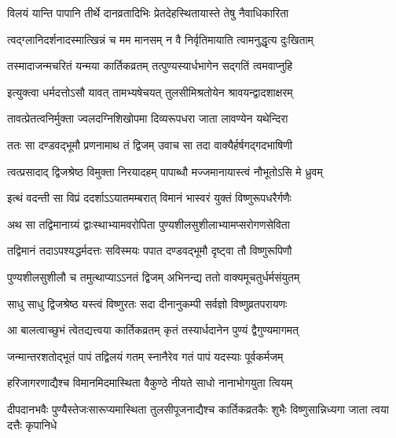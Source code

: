 


\twolineshloka
{विलयं यान्ति पापानि तीर्थे दानव्रतादिभिः}
{प्रेतदेहस्थितायास्ते तेषु नैवाधिकारिता} %

\twolineshloka
{त्वद्ग्लानिदर्शनादस्मात्खिन्नं च मम मानसम्}
{न वै निर्वृतिमायाति त्वामनुद्धृत्य दुःखिताम्} %

\twolineshloka
{तस्मादाजन्मचरितं यन्मया कार्तिकव्रतम्}
{तत्पुण्यस्यार्धभागेन सद्गतिं त्वमवाप्नुहि} %


\twolineshloka
{इत्युक्त्वा धर्मदत्तोऽसौ यावत् तामभ्यषेचयत्}
{तुलसीमिश्रतोयेन श्रावयन्द्वादशाक्षरम्} %

\twolineshloka
{तावत्प्रेतत्वनिर्मुक्ता ज्वलदग्निशिखोपमा}
{दिव्यरूपधरा जाता लावण्येन यथेन्दिरा} %

\twolineshloka
{ततः सा दण्डवद्भूमौ प्रणनामाथ तं द्विजम्}
{उवाच सा तदा वाक्यैर्हर्षगद्गदभाषिणी} %


\twolineshloka
{त्वत्प्रसादाद् द्विजश्रेष्ठ विमुक्ता निरयादहम्}
{पापाब्धौ मज्जमानायास्त्वं नौभूतोऽसि मे ध्रुवम्} %


\twolineshloka
{इत्थं वदन्ती सा विप्रं ददर्शाऽऽयातमम्बरात्}
{विमानं भास्वरं युक्तं विष्णुरूपधरैर्गणैः} %

\twolineshloka
{अथ सा तद्विमानाग्र्यं द्वाःस्थाभ्यामवरोपिता}
{पुण्यशीलसुशीलाभ्यामप्सरोगणसेविता} %

\twolineshloka
{तद्विमानं तदाऽपश्यद्धर्मदत्तः सविस्मयः}
{पपात दण्डवद्भूमौ दृष्ट्वा तौ विष्णुरूपिणौ} %

\twolineshloka
{पुण्यशीलसुशीलौ च तमुत्थाप्याऽऽनतं द्विजम्}
{अभिनन्द्य ततो वाक्यमूचतुर्धर्मसंयुतम्} %


\twolineshloka
{साधु साधु द्विजश्रेष्ठ यस्त्वं विष्णुरतः सदा}
{दीनानुकम्पी सर्वज्ञो विष्णुव्रतपरायणः} %


\twolineshloka
{आ बालत्वाच्छुभं त्वेतद्यत्त्वया कार्तिकव्रतम्}
{कृतं तस्यार्धदानेन पुण्यं द्वैगुण्यमागमत्} %

\twolineshloka
{जन्मान्तरशतोद्भूतं पापं तद्विलयं गतम्}
{स्नानैरेव गतं पापं यदस्याः पूर्वकर्मजम्} %

\twolineshloka
{हरिजागरणाद्यैश्च विमानमिदमास्थिता}
{वैकुण्ठे नीयते साधो नानाभोगयुता त्वियम्} %

\threelineshloka
{दीपदानभवैः पुण्यैस्तेजःसारूप्यमास्थिता}
{तुलसीपूजनाद्यैश्च कार्तिकव्रतकैः शुभैः}
{विष्णुसान्निध्यगा जाता त्वया दत्तैः कृपानिधे} %

